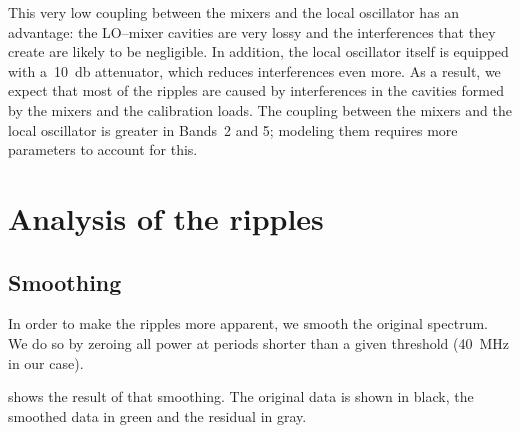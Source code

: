 \begin{refsection}
This very low coupling between the mixers and the local oscillator has an advantage: the LO--mixer cavities are very lossy and the interferences that they create are likely to be negligible.
In addition, the local oscillator itself is equipped with a~\SI{10}{\decibel} attenuator, which reduces interferences even more.
As a result, we expect that most of the ripples are caused by interferences in the cavities formed by the mixers and the calibration loads.
The coupling between the mixers and the local oscillator is greater in Bands~2 and 5; modeling them requires more parameters to account for this.





\FloatBarrier



\section{Analysis of the ripples}




\subsection{Smoothing}
In order to make the ripples more apparent, we smooth the original spectrum.
We do so by zeroing all power at periods shorter than a given threshold (\SI{40}{\mega\hertz} in our case).

 shows the result of that smoothing.
The original data is shown in black, the smoothed data in green and the residual in gray.


\end{refsection}
